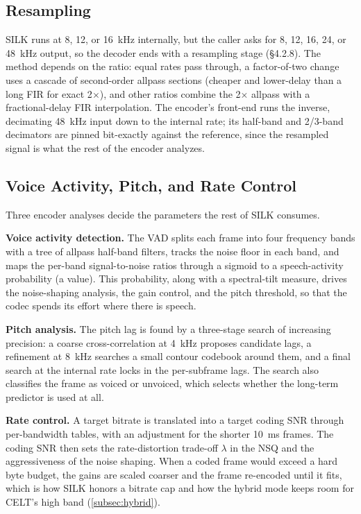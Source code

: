 \subsection{Resampling}\label{subsec:silk_resampler}

SILK runs at 8, 12, or 16~kHz internally, but the caller asks for 8, 12, 16, 24,
or 48~kHz output, so the decoder ends with a resampling stage (\S4.2.8). The
method depends on the ratio: equal rates pass through, a factor-of-two change
uses a cascade of second-order allpass sections (cheaper and lower-delay than a
long FIR for exact 2$\times$), and other ratios combine the 2$\times$
allpass with
a fractional-delay FIR interpolation. The encoder's front-end runs the inverse,
decimating 48~kHz input down to the internal rate; its half-band and 2/3-band
decimators are pinned bit-exactly against the reference, since the resampled
signal is what the rest of the encoder analyzes.

\subsection{Voice Activity, Pitch, and Rate Control}\label{subsec:silk_control}

Three encoder analyses decide the parameters the rest of SILK consumes.

\textbf{Voice activity detection.} The VAD splits each frame into four frequency
bands with a tree of allpass half-band filters, tracks the noise floor in each
band, and maps the per-band signal-to-noise ratios through a sigmoid to a
speech-activity probability (a  value). This probability, along with a
spectral-tilt measure, drives the noise-shaping analysis, the gain control, and
the pitch threshold, so that the codec spends its effort where there is speech.

\textbf{Pitch analysis.} The pitch lag is found by a three-stage search of
increasing precision: a coarse cross-correlation at 4~kHz proposes candidate
lags, a refinement at 8~kHz searches a small contour codebook around them, and a
final search at the internal rate locks in the per-subframe lags. The
search also
classifies the frame as voiced or unvoiced, which selects whether the long-term
predictor is used at all.

\textbf{Rate control.} A target bitrate is translated into a target coding SNR
through per-bandwidth tables, with an adjustment for the shorter 10~ms frames.
The coding SNR then sets the rate-distortion trade-off $\lambda$ in the NSQ and
the aggressiveness of the noise shaping. When a coded frame would exceed a hard
byte budget, the gains are scaled coarser and the frame re-encoded
until it fits,
which is how SILK honors a bitrate cap and how the hybrid mode keeps room for
CELT's high band (\cref{subsec:hybrid}).

